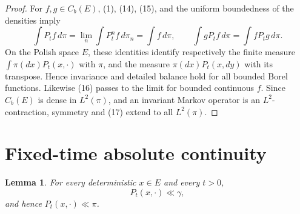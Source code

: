\documentclass[12pt]{article}
\newtheorem{lemma}{Lemma}
\newcommand{\1}{\mathbf 1}
\begin{document}
\begin{proof}
For \(f,g\in C_b(E)\), (1), (14), (15), and the uniform boundedness of the
densities imply
\[
 \int P_tf\,d\pi=\lim_n\int P_t^nf\,d\pi_n=\int f\,d\pi,\qquad
 \int gP_tf\,d\pi=\int fP_tg\,d\pi .
\]
On the Polish space \(E\), these identities identify respectively the finite
measure \(\int\pi(dx)P_t(x,\cdot)\) with \(\pi\), and the measure
\(\pi(dx)P_t(x,dy)\) with its transpose.  Hence invariance and detailed balance
hold for all bounded Borel functions.  Likewise (16) passes to the limit for
bounded continuous \(f\).  Since \(C_b(E)\) is dense in \(L^2(\pi)\), and an
invariant Markov operator is an \(L^2\)-contraction, symmetry and (17) extend
to all \(L^2(\pi)\).
\end{proof}

\section*{Fixed-time absolute continuity}

\begin{lemma}\label{lem:control}
For every deterministic \(x\in E\) and every \(t>0\),
\[
        P_t(x,\cdot)\ll \gamma ,
\]
and hence \(P_t(x,\cdot)\ll\pi\).
\end{lemma}
\end{document}
